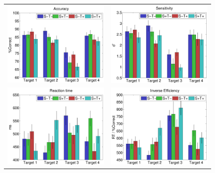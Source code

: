 \documentclass[dwyatte_dissertation.tex]{subfiles}
\begin{document}
\begin{figure}[h!]
\begin{center}
\begin{tabular}{ll}
\includegraphics[width=80mm]{figs/chap_bpleast/results_accuracy_obj.pdf} &
\includegraphics[width=80mm]{figs/chap_bpleast/results_dprime_obj.pdf} \\
\includegraphics[width=80mm]{figs/chap_bpleast/results_rt_obj.pdf} &
\includegraphics[width=80mm]{figs/chap_bpleast/results_ie_obj.pdf} \\

\end{tabular}
\end{center}
\end{figure}
\end{document}
